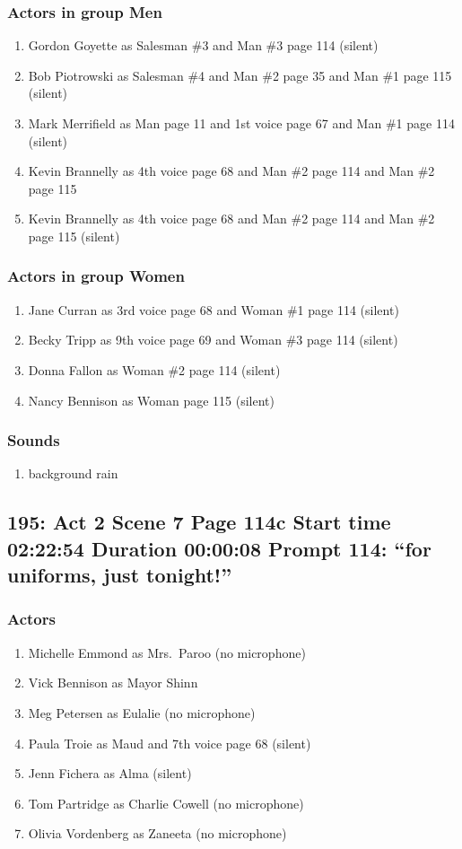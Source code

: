 \subsubsection{Actors in group Men}
\begin{enumerate}
\item Gordon Goyette as Salesman \#3 and Man \#3 page 114 (silent)
\item Bob Piotrowski as Salesman \#4 and Man \#2 page 35 and Man \#1 page 115 (silent)
\item Mark Merrifield as Man page 11 and 1st voice page 67 and Man \#1 page 114 (silent)
\item Kevin Brannelly as 4th voice page 68 and Man \#2 page 114 and Man \#2 page 115
\item Kevin Brannelly as 4th voice page 68 and Man \#2 page 114 and Man \#2 page 115 (silent)
\end{enumerate}
\subsubsection{Actors in group Women}
\begin{enumerate}
\item Jane Curran as 3rd voice page 68 and Woman \#1 page 114 (silent)
\item Becky Tripp as 9th voice page 69 and Woman \#3 page 114 (silent)
\item Donna Fallon as Woman \#2 page 114 (silent)
\item Nancy Bennison as Woman page 115 (silent)
\end{enumerate}

\subsubsection{Sounds}
\begin{enumerate}
\item background rain
\end{enumerate}
\subsection{195: Act 2 Scene 7 Page 114c Start time 02:22:54 Duration 00:00:08 Prompt 114: ``for uniforms, just tonight!''}

\subsubsection{Actors}
\begin{enumerate}
\item Michelle Emmond as Mrs.~Paroo (no microphone)
\item Vick Bennison as Mayor Shinn
\item Meg Petersen as Eulalie (no microphone)
\item Paula Troie as Maud and 7th voice page 68 (silent)
\item Jenn Fichera as Alma (silent)
\item Tom Partridge as Charlie Cowell (no microphone)
\item Olivia Vordenberg as Zaneeta (no microphone)
\end{enumerate}
